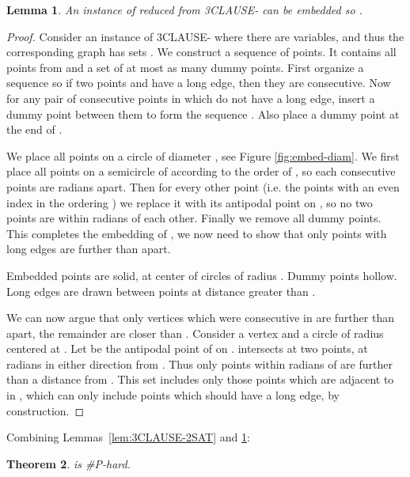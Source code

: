 \documentclass{journal}
\newcommand{\PDIAM}{\xspace}
\newcommand{\twoSAT}{\xspace}
\newtheorem {theorem}{Theorem}[section]
\newtheorem {lemma}[theorem]{Lemma}
\begin{document}
\begin{lemma}
\label{lem:embed-DIAM}
An instance of \PDIAM reduced from 3CLAUSE-\twoSAT can be embedded so .
\end{lemma}
\begin{proof}

Consider an instance of 3CLAUSE-\twoSAT where there are  variables, and thus the corresponding graph has  sets .  We construct a sequence  of  points.
It contains all points from  and a set of at most as many dummy points.
First organize a sequence  so if two points  and  have a long edge, then they are consecutive.  Now for any pair of consecutive points in  which do not have a long edge, insert a dummy point between them to form the sequence .  Also place a dummy point at the end of .

We place all points on a circle  of diameter , see Figure \ref{fig:embed-diam}.
We first place all points on a semicircle of  according to the order of , so each consecutive points are  radians apart.  Then for every other point (i.e. the points with an even index in the ordering ) we replace it with its antipodal point on , so no two points are within  radians of each other.  Finally we remove all dummy points.
This completes the embedding of , we now need to show that only points with long edges are further than  apart.

{Embedded points are solid, at center of circles of radius .  Dummy points hollow. Long edges are drawn between points at distance greater than .}

We can now argue that only vertices which were consecutive in  are further than  apart, the remainder are closer than .  Consider a vertex  and a circle  of radius  centered at .  Let  be the antipodal point of  on .   intersects  at two points, at  radians in either direction from .  Thus only points within  radians of  are further than a distance  from .  This set includes only those points which are adjacent to  in , which can only include points which should have a long edge, by construction.  
\end{proof}

Combining Lemmas~\ref {lem:3CLAUSE-2SAT} and \ref {lem:embed-DIAM}: 
\begin{theorem}
\PDIAM is \#P-hard.
\end{theorem}
\end{document}
